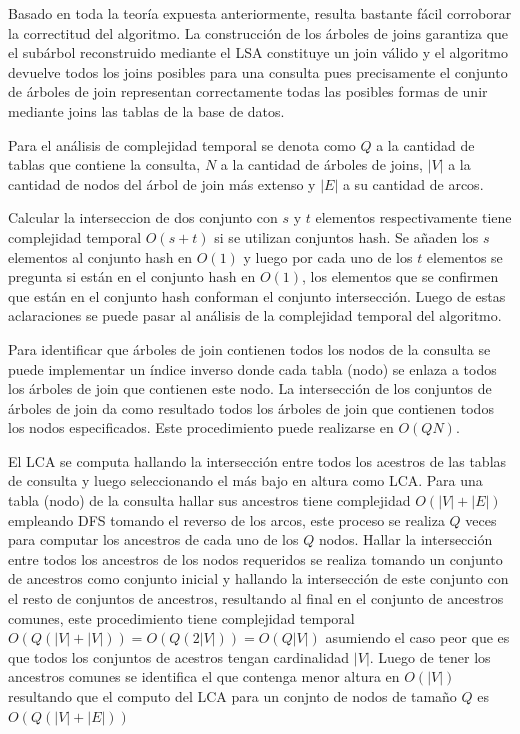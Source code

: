 Basado en toda la teor\'ia expuesta anteriormente, resulta bastante f\'acil corroborar la correctitud del 
algoritmo. La construcci\'on de los \'arboles de joins garantiza que el sub\'arbol reconstruido mediante el 
LSA constituye un join v\'alido y el algoritmo devuelve todos los joins posibles para una consulta pues 
precisamente el conjunto de \'arboles de join representan correctamente todas las posibles formas de 
unir mediante joins las tablas de la base de datos.

Para el an\'alisis de complejidad temporal se denota como $Q$ a la cantidad de tablas que contiene la consulta, 
$N$ a la cantidad de \'arboles de joins, $|V|$ a la cantidad de nodos del \'arbol de join m\'as extenso y $|E|$
a su cantidad de arcos. 

Calcular la interseccion de dos conjunto con $s$ y $t$ elementos respectivamente tiene 
complejidad temporal $O(s + t)$ si se utilizan conjuntos hash. Se añaden los $s$ elementos al conjunto hash en $O(1)$
y luego por cada uno de los $t$ elementos se pregunta si est\'an en el conjunto hash en $O(1)$, los elementos 
que se confirmen que est\'an en el conjunto hash conforman el conjunto intersección. Luego de estas aclaraciones 
se puede pasar al an\'alisis de la complejidad temporal del algoritmo.

Para identificar que \'arboles de join contienen todos los nodos de la consulta se puede implementar un índice 
inverso donde cada tabla (nodo) se enlaza a todos los árboles de join que contienen 
este nodo. La intersección de los conjuntos de árboles de join da como resultado todos los árboles de join 
que contienen todos los nodos especificados. Este procedimiento puede realizarse en $O(QN)$. 

El LCA se computa hallando la intersecci\'on entre todos los acestros de las tablas de consulta y luego 
seleccionando el m\'as bajo en altura como LCA. Para una tabla (nodo) de la consulta hallar sus ancestros 
tiene complejidad $O(|V| + |E|)$ empleando DFS tomando el reverso de los arcos, este proceso se realiza $Q$ veces
para computar los ancestros de cada uno de los $Q$ nodos. 
Hallar la intersección 
entre todos los ancestros de los nodos requeridos se realiza tomando un conjunto de ancestros 
como conjunto inicial y hallando la intersección de este conjunto con el resto de conjuntos de ancestros, 
resultando al final en el conjunto de ancestros comunes, este procedimiento tiene complejidad temporal 
$O(Q(|V| + |V|)) = O(Q(2|V|)) = O(Q|V|)$ asumiendo el caso peor que es que todos los conjuntos de acestros 
tengan cardinalidad $|V|$. Luego de tener los ancestros comunes se identifica el que contenga menor altura 
en $O(|V|)$ resultando que el computo del LCA para un conjnto de nodos de tamaño $Q$ es $O(Q(|V| + |E|))$

